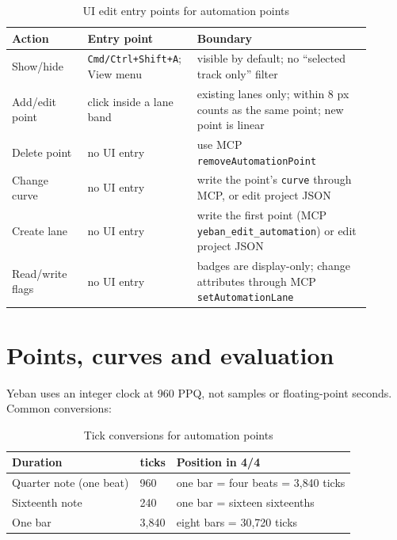 \begin{table}[htbp]
\centering
\small
\begin{tabular}{@{}p{0.20\linewidth}p{0.24\linewidth}p{0.46\linewidth}@{}}
\hline
Action & Entry point & Boundary \\
\hline
Show/hide & \texttt{Cmd/\allowbreak Ctrl+Shift+A}; View menu & visible by default; no ``selected track only'' filter \\
Add/edit point & click inside a lane band & existing lanes only; within 8 px counts as the same point; new point is linear \\
Delete point & no UI entry & use MCP \texttt{removeAutomationPoint} \\
Change curve & no UI entry & write the point's \texttt{curve} through MCP, or edit project JSON \\
Create lane & no UI entry & write the first point (MCP \texttt{yeban\_edit\_automation}) or edit project JSON \\
Read/write flags & no UI entry & badges are display-only; change attributes through MCP \texttt{set\allowbreak Automation\allowbreak Lane} \\
\hline
\end{tabular}
\caption{UI edit entry points for automation points}
\label{tab:automation-edit-entry}
\end{table}


\section{Points, curves and evaluation}

Yeban uses an integer clock at 960 PPQ, not samples or floating-point seconds. Common conversions:

\begin{table}[htbp]
\centering
\small
\begin{tabular}{@{}lll@{}}
\hline
Duration & ticks & Position in 4/4 \\
\hline
Quarter note (one beat) & 960 & one bar = four beats = 3{,}840 ticks \\
Sixteenth note & 240 & one bar = sixteen sixteenths \\
One bar & 3{,}840 & eight bars = 30{,}720 ticks \\
\hline
\end{tabular}
\caption{Tick conversions for automation points}
\label{tab:automation-ticks}
\end{table}

